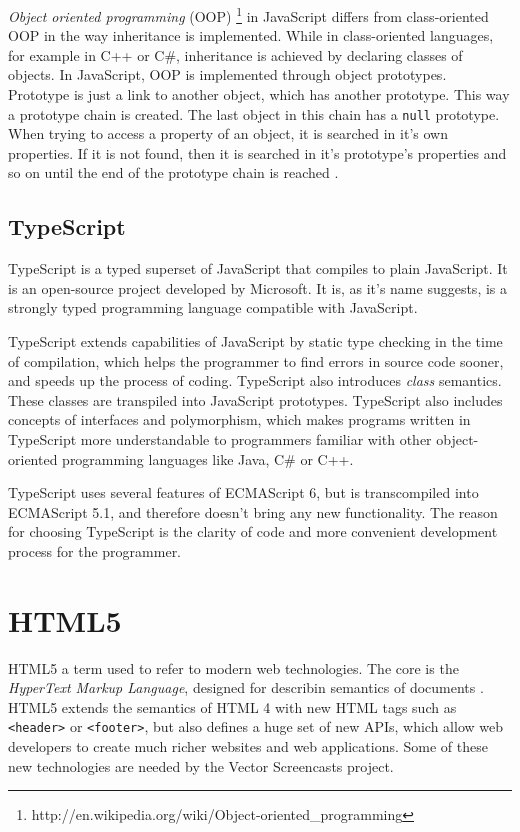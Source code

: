 \textit{Object oriented programming} (OOP) \footnote{http://en.wikipedia.org/wiki/Object-oriented\_programming} in JavaScript differs from class-oriented OOP in the way inheritance is implemented. While in class-oriented languages, for example in C++ or C\#, inheritance is achieved by declaring classes of objects. In JavaScript, OOP is implemented through object prototypes. Prototype is just a link to another object, which has another prototype. This way a prototype chain is created. The last object in this chain has a \verb|null| prototype. When trying to access a property of an object, it is searched in it's own properties. If it is not found, then it is searched in it's prototype's properties and so on until the end of the prototype chain is reached \cite{mdn_prototype_chain}.

\subsection{TypeScript}
TypeScript is a typed superset of JavaScript that compiles to plain JavaScript\cite{typescript}. It is an open-source project developed by Microsoft. It is, as it's name suggests, is a strongly typed programming language compatible with JavaScript.

TypeScript extends capabilities of JavaScript by static type checking in the time of compilation, which helps the programmer to find errors in source code sooner, and speeds up the process of coding. TypeScript also introduces \textit{class} semantics. These classes are transpiled into JavaScript prototypes. TypeScript also includes concepts of interfaces and polymorphism, which makes programs written in TypeScript more understandable to programmers familiar with other object-oriented programming languages like Java, C\# or C++.

TypeScript uses several features of ECMAScript 6, but is transcompiled into ECMAScript 5.1, and therefore doesn't bring any new functionality. The reason for choosing TypeScript is the clarity of code and more convenient development process for the programmer.








\section{HTML5}

HTML5 a term used to refer to modern web technologies. The core is the \textit{HyperText Markup Language}, designed for describin semantics of documents \cite{html5}. HTML5 extends the semantics of HTML 4 with new HTML tags such as \verb|<header>| or \verb|<footer>|, but also defines a huge set of new APIs, which allow web developers to create much richer websites and web applications. Some of these new technologies are needed by the Vector Screencasts project.

